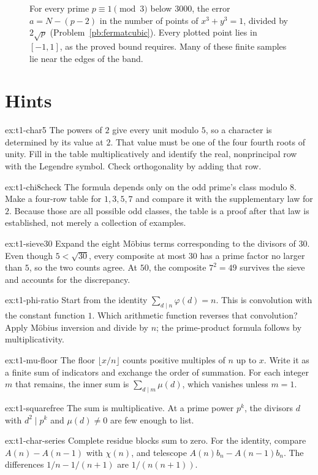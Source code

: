 \begin{figure}[ht]
\centering
{}
\caption{For every prime $p\equiv1\pmod3$ below $3000$, the error $a=N-(p-2)$ in the number of points of $x^3+y^3=1$, divided by
$2\sqrt p$ (Problem~\ref{pb:fermatcubic}). Every plotted point lies in $[-1,1]$, as the proved bound requires. Many of these finite samples lie near the edges of the band.}
\label{fig:cubic}
\end{figure}

\section{Hints}

\begin{hint}{ex:t1-char5}
The powers of $2$ give every unit modulo $5$, so a character is determined by its value at $2$. That value must be one of the four fourth roots of unity. Fill in the table multiplicatively and identify the real, nonprincipal row with the Legendre symbol. Check orthogonality by adding that row.
\end{hint}
\begin{hint}{ex:t1-chi8check}
The formula depends only on the odd prime's class modulo $8$. Make a four-row table for $1,3,5,7$ and compare it with the supplementary law for $2$. Because those are all possible odd classes, the table is a proof after that law is established, not merely a collection of examples.
\end{hint}
\begin{hint}{ex:t1-sieve30}
Expand the eight Möbius terms corresponding to the divisors of $30$. Even though $5<\sqrt{30}$, every composite at most $30$ has a prime factor no larger than $5$, so the two counts agree. At $50$, the composite $7^2=49$ survives the sieve and accounts for the discrepancy.
\end{hint}
\begin{hint}{ex:t1-phi-ratio}
Start from the identity $\sum_{d\mid n}\varphi(d)=n$. This is convolution with the constant function $1$. Which arithmetic function reverses that convolution? Apply Möbius inversion and divide by $n$; the prime-product formula follows by multiplicativity.
\end{hint}
\begin{hint}{ex:t1-mu-floor}
The floor $\lfloor x/n\rfloor$ counts positive multiples of $n$ up to $x$. Write it as a finite sum of indicators and exchange the order of summation. For each integer $m$ that remains, the inner sum is $\sum_{d\mid m}\mu(d)$, which vanishes unless $m=1$.
\end{hint}
\begin{hint}{ex:t1-squarefree}
The sum is multiplicative. At a prime power $p^k$, the divisors $d$ with $d^2\mid p^k$ and $\mu(d)\ne0$ are few enough to list.
\end{hint}
\begin{hint}{ex:t1-char-series}
Complete residue blocks sum to zero. For the identity, compare $A(n)-A(n-1)$ with $\chi(n)$, and telescope $A(n)b_n-A(n-1)b_n$. The differences $1/n-1/(n+1)$ are $1/(n(n+1))$.
\end{hint}


